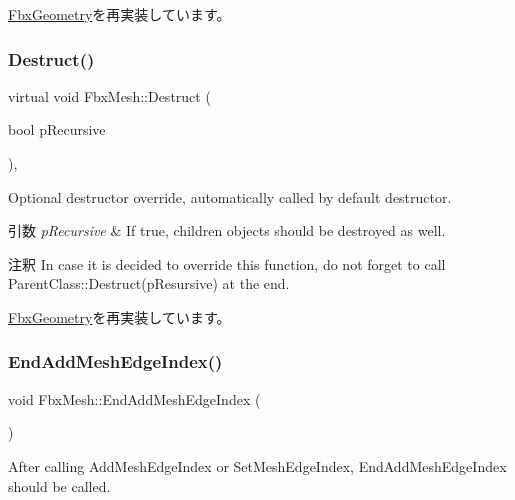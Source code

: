 \hyperlink{class_fbx_geometry_aac1cee4251e3d5fbd27f1181c58b83b3}{Fbx\+Geometry}を再実装しています。

\mbox{\label{class_fbx_mesh_a1755e89d515fadbc2d52924917b618f7}} 
\subsubsection{\texorpdfstring{Destruct()}{Destruct()}}
{\footnotesize\ttfamily virtual void Fbx\+Mesh\+::\+Destruct (\begin{DoxyParamCaption}\item[{bool}]{p\+Recursive }\end{DoxyParamCaption})\hspace{0.3cm}{\ttfamily [protected]}, {\ttfamily [virtual]}}

Optional destructor override, automatically called by default destructor. 
\begin{DoxyParams}{引数}
{\em p\+Recursive} & If true, children objects should be destroyed as well. \\
\hline
\end{DoxyParams}
\begin{DoxyRemark}{注釈}
In case it is decided to override this function, do not forget to call Parent\+Class\+::\+Destruct(p\+Resursive) at the end. 
\end{DoxyRemark}


\hyperlink{class_fbx_geometry_a07e94f7801067d66429afbf1799795cd}{Fbx\+Geometry}を再実装しています。

\mbox{\label{class_fbx_mesh_a933636875bbe11e0a214644d96194079}} 
\subsubsection{\texorpdfstring{End\+Add\+Mesh\+Edge\+Index()}{EndAddMeshEdgeIndex()}}
{\footnotesize\ttfamily void Fbx\+Mesh\+::\+End\+Add\+Mesh\+Edge\+Index (\begin{DoxyParamCaption}{ }\end{DoxyParamCaption})}

After calling Add\+Mesh\+Edge\+Index or Set\+Mesh\+Edge\+Index, End\+Add\+Mesh\+Edge\+Index should be called. \mbox{\label{class_fbx_mesh_accc59f6a71fd42bdf4d547c14f98bd90}} 
